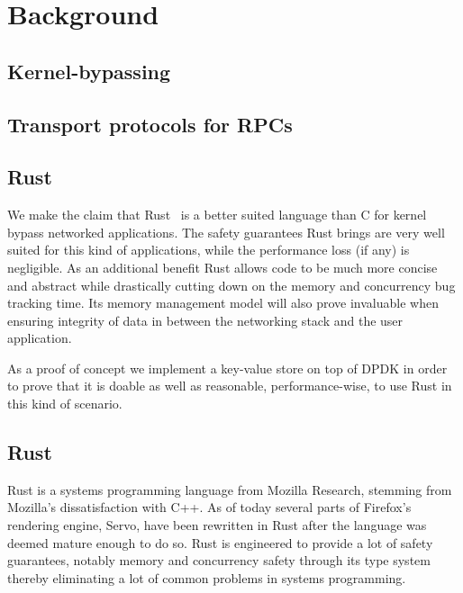 \documentclass[11pt]{book}
\newcommand{\marios}[1]{\noindent{{\bf \fbox{MK:} {\textcolor{green}{\it#1}}}}}
\begin{document}
\chapter{Background}
\marios{In this section we need to show you read and understood the area. This is where most of your references will come from.}
\section{Kernel-bypassing}
\marios{IX, Arrakis, DPDK, SPDK, NetBricks, etc. Why we do that? What's the benefit? Problems? Main applications? kv-stores. Thus, we can codesign the networking stack and the application.}

\section{Transport protocols for RPCs}
\marios{TCP, UDP, R2P2, reliable vs non reliable and implications to the application behaviour. Reliability is where copies come from. We need reliability though. Can we eliminate copies?}

\section{Rust}

We make the claim that Rust~\cite{rustbook} is a better suited
language than C for kernel bypass networked applications. The safety
guarantees Rust brings are very well suited for this kind of
applications, while the performance loss (if any) is negligible. As an
additional benefit Rust allows code to be much more concise and
abstract while drastically cutting down on the memory and concurrency
bug tracking time. Its memory management model will also prove
invaluable when ensuring integrity of data in between the networking
stack and the user application.

As a proof of concept we implement a key-value store on top of
DPDK in order to prove that it is doable as well as reasonable,
performance-wise, to use Rust in this kind of scenario.

\section{Rust}

Rust is a systems programming language from Mozilla Research, stemming
from Mozilla's dissatisfaction with C++. As of today several parts of
Firefox's rendering engine, Servo, have been rewritten in Rust after
the language was deemed mature enough to do so. Rust is engineered to
provide a lot of safety guarantees, notably memory and concurrency
safety through its type system thereby eliminating a lot of common
problems in systems programming.
\end{document}

